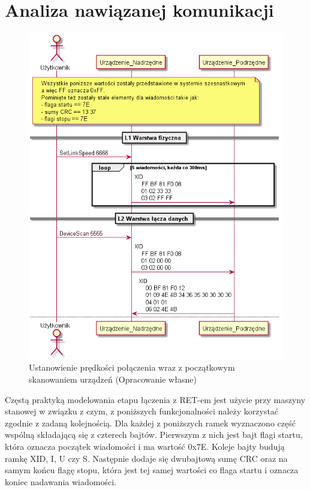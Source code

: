 \chapter{Analiza nawiązanej komunikacji}
    \begin{figure}[h!]
        \centering
        \includegraphics[scale=0.70]{out/Diagramy/UML_DiagramOfSequence_New/UML_DiagramOfSequence_New-page1.png}
        \caption{Ustanowienie prędkości połączenia wraz z początkowym skanowaniem urządzeń
            \newline(Opracowanie własne)}
        \label{fig:DiagramSequence_LinkSpeed_DeviceScan}
        \end{figure}
    \newpage

	Częstą praktyką modelowania etapu łączenia z RET-em jest użycie przy maszyny stanowej w związku z czym, z poniższych funkcjonalności należy korzystać zgodnie z zadaną kolejnością.
	Dla każdej z poniższych ramek wyznaczono część wspólną składającą się z czterech bajtów. Pierwszym z nich jest bajt flagi startu, która oznacza początek wiadomości i ma wartość 0x7E.
	Koleje bajty budują ramkę XID, I, U czy S. Następnie dodaje się dwubajtową sumę CRC oraz na samym końcu flagę stopu, która jest tej samej wartości co flaga startu i oznacza koniec nadawania wiadomości.

